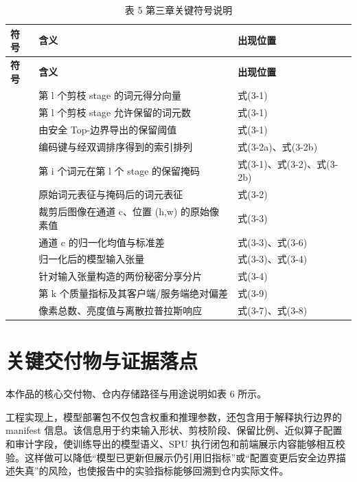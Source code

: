 \begin{longtable}{>{\raggedright\arraybackslash}p{}>{\raggedright\arraybackslash}p{}>{\raggedright\arraybackslash}p{}}
\caption{表 5 第三章关键符号说明}\\
\toprule
\textbf{符号} & \textbf{含义} & \textbf{出现位置} \\
\midrule
\endfirsthead
\toprule
\textbf{符号} & \textbf{含义} & \textbf{出现位置} \\
\midrule
\endhead
 & 第 l 个剪枝 stage 的词元得分向量 & 式(3-1) \\
 & 第 l 个剪枝 stage 允许保留的词元数 & 式(3-1) \\
 & 由安全 Top-边界导出的保留阈值 & 式(3-1) \\
 & 编码键与经双调排序得到的索引排列 & 式(3-2a)、式(3-2b) \\
 & 第 i 个词元在第 l 个 stage 的保留掩码 & 式(3-1)、式(3-2)、式(3-2b) \\
 & 原始词元表征与掩码后的词元表征 & 式(3-2) \\
 & 裁剪后图像在通道 c、位置 (h,w) 的原始像素值 & 式(3-3) \\
 & 通道 c 的归一化均值与标准差 & 式(3-3)、式(3-6) \\
 & 归一化后的模型输入张量 & 式(3-3)、式(3-4) \\
 & 针对输入张量构造的两份秘密分享分片 & 式(3-4) \\
 & 第 k 个质量指标及其客户端/服务端绝对偏差 & 式(3-9) \\
 & 像素总数、亮度值与离散拉普拉斯响应 & 式(3-7)、式(3-8) \\
\bottomrule
\end{longtable}

\section{关键交付物与证据落点}

本作品的核心交付物、仓内存储路径与用途说明如表 6 所示。

工程实现上，模型部署包不仅包含权重和推理参数，还包含用于解释执行边界的 manifest 信息。该信息用于约束输入形状、剪枝阶段、保留比例、近似算子配置和审计字段，使训练导出的模型语义、SPU 执行闭包和前端展示内容能够相互校验。这样做可以降低“模型已更新但展示仍引用旧指标”或“配置变更后安全边界描述失真”的风险，也使报告中的实验指标能够回溯到仓内实际文件。

